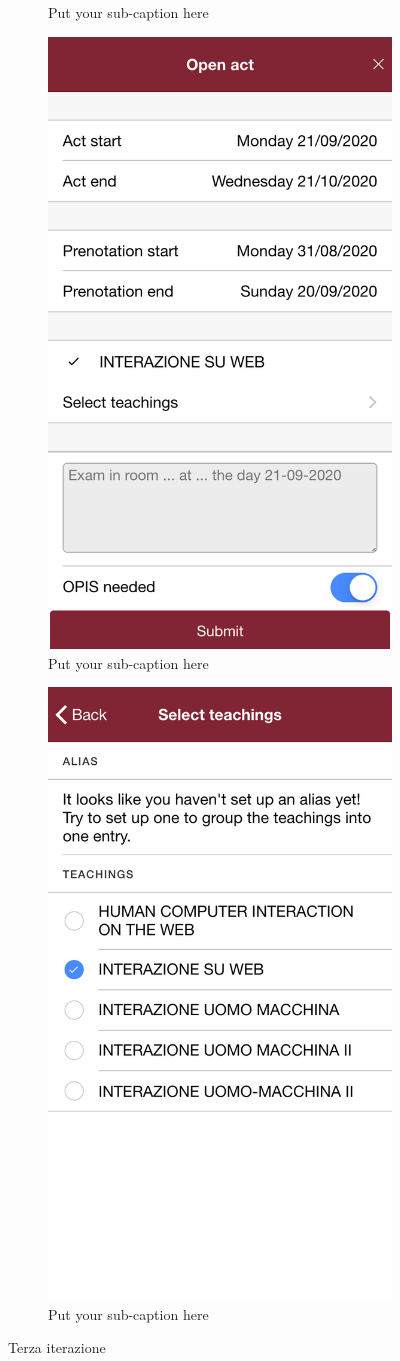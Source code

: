 \documentclass[Lau, oneside, noexaminfo]{sapthesis}%
\begin{document}
\begin{figure}[H]
\begin{subfigure}{0.6\textwidth}
	  \caption{Put your sub-caption here}
	  \label{fig:sub-second}
	\end{subfigure}
	\begin{subfigure}{0.6\textwidth}
		\centering
		\includegraphics[width=0.5\linewidth]{ui-iterations/iii/form}  
		\caption{Put your sub-caption here}
		\label{fig:sub-second}
	  \end{subfigure}
	  \begin{subfigure}{0.6\textwidth}
		\centering
		\includegraphics[width=0.5\linewidth]{ui-iterations/iii/insegnamenti}  
		\caption{Put your sub-caption here}
		\label{fig:sub-second}
	  \end{subfigure}
	  
	\caption{Terza iterazione}
	\label{fig:it-3}
\end{figure}
\end{document}
